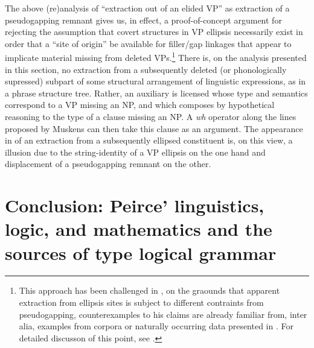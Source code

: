 \documentclass[output=paper,colorlinks,citecolor=brown]{langscibook}
\begin{document}
The above (re)analysis of ``extraction out of an elided VP'' as
extraction of a pseudogapping remnant gives us, in effect, a
proof-of-concept argument for rejecting the assumption that covert
structures in VP ellipsis necessarily exist in order that a ``site of
origin'' be available for filler/gap linkages that appear to implicate
material missing from deleted VPs.\footnote{This approach has been
challenged in \citet{johnson2001}, on the graounds that apparent extraction
from ellipsis sites is subject to different contraints from
pseudogapping, counterexamples to his claims are already familiar
from, inter alia, examples from corpora or naturally occurring data
presented in \citet{levin-diss}. For detailed discusson of this point, see
\citet[Section~8.4.2]{kubotalevineBook}.} There is, on the analysis
presented in this section, no extraction from a subsequently deleted
(or phonologically supressed) subpart of some structural arrangement
of linguistic expressions, as in a phrase structure tree. Rather, an
auxiliary is licensed whose type and semantics correspond to a VP
missing an NP, and which composes by hypothetical reasoning to the
type of a clause missing an NP. A \textit{wh} operator along the lines
proposed by Muskens can then take this clause as an argument. The
appearance in  of an extraction from a subsequently
ellipsed constituent is, on this view, a illusion due to the
string-identity of a VP ellipsis on the one hand and displacement of a
pseudogapping remnant on the other.

\section{Conclusion: Peirce' linguistics, logic, and mathematics and the sources of type logical grammar}
\end{document}
